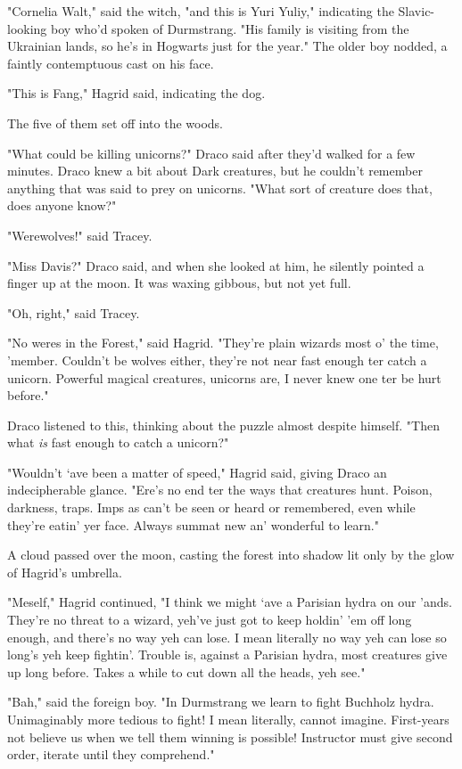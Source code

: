 "Cornelia Walt," said the witch, "and this is Yuri Yuliy," indicating the 
Slavic-looking boy who'd spoken of Durmstrang. "His family is visiting from the 
Ukrainian lands, so he's in Hogwarts just for the year." The older boy nodded, 
a faintly contemptuous cast on his face.

"This is Fang," Hagrid said, indicating the dog.

The five of them set off into the woods.

"What could be killing unicorns?" Draco said after they'd walked for a few 
minutes. Draco knew a bit about Dark creatures, but he couldn't remember 
anything that was said to prey on unicorns. "What sort of creature does that, 
does anyone know?"

"Werewolves!" said Tracey.

"Miss Davis?" Draco said, and when she looked at him, he silently pointed a 
finger up at the moon. It was waxing gibbous, but not yet full.

"Oh, right," said Tracey.

"No weres in the Forest," said Hagrid. "They're plain wizards most o' the time, 
'member. Couldn't be wolves either, they're not near fast enough ter catch a 
unicorn. Powerful magical creatures, unicorns are, I never knew one ter be hurt 
before."

Draco listened to this, thinking about the puzzle almost despite himself. "Then 
what \emph{is} fast enough to catch a unicorn?"

"Wouldn't `ave been a matter of speed," Hagrid said, giving Draco an 
indecipherable glance. "Ere's no end ter the ways that creatures hunt. Poison, 
darkness, traps. Imps as can't be seen or heard or remembered, even while 
they're eatin' yer face. Always summat new an' wonderful to learn."

A cloud passed over the moon, casting the forest into shadow lit only by the 
glow of Hagrid's umbrella.

"Meself," Hagrid continued, "I think we might `ave a Parisian hydra on our 
'ands. They're no threat to a wizard, yeh've just got to keep holdin' 'em off 
long enough, and there's no way yeh can lose. I mean literally no way yeh can 
lose so long's yeh keep fightin'. Trouble is, against a Parisian hydra, most 
creatures give up long before. Takes a while to cut down all the heads, yeh 
see."

"Bah," said the foreign boy. "In Durmstrang we learn to fight Buchholz hydra. 
Unimaginably more tedious to fight! I mean literally, cannot imagine. 
First-years not believe us when we tell them winning is possible! Instructor 
must give second order, iterate until they comprehend."


